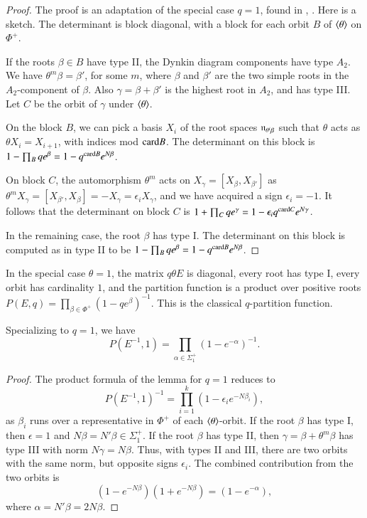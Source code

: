 \begin{proof} The proof is an adaptation  of the special case $q=1$, 
found in \cite{jantzen1977darstellungen}, \cite{wendt2001weyl}.  Here is a sketch.
The determinant is block diagonal, with a block for each orbit $B$ of $\langle{\theta}\rangle$ on $\Phi^+$.

If the roots $\beta\in B$ have type II, the Dynkin diagram components have type $A_2$.
We have $\theta^m \beta = \beta'$, for some $m$, where $\beta$ and $\beta'$ are the two simple roots in the $A_2$-component of $\beta$.
Also $\gamma = \beta + \beta'$ is the highest root in $A_2$, and has type III.  
Let $C$ be the orbit of $\gamma$ under $\langle{\theta}\rangle$.  

On the block $B$, we can pick a basis $X_i$ of the
root spaces ${\mathfrak n}_{\theta^i\beta}$ such that $\theta$ acts as $\theta X_i = X_{i+1}$, with indices mod ${\operatorname{card}}{B}$.
The determinant on this block is $1- \prod_B {q e^{\beta}} = 1- q^{{\operatorname{card}} B} e^{N \beta}$.

On block $C$, the automorphism $\theta^m$ acts on $X_\gamma = [X_\beta,X_{\beta'}]$ 
as $\theta^m X_\gamma = [X_{\beta'},X_\beta] = -X_\gamma =\epsilon_i X_\gamma$, 
and we have acquired a sign $\epsilon_i=-1$.  
It follows that the determinant on block $C$
is $1+\prod_C {q e^\gamma} = 1-\epsilon_i q^{{\operatorname{card}} C} e^{N\gamma}$.

In the remaining case,  the root $\beta$ has type I.  
The determinant on this block is computed as in  type II to be $1- \prod_B q e^{\beta} = 1- q^{{\operatorname{card}}{B}} e^{N \beta}$.
\end{proof}


In the special case $\theta=1$, the matrix $q \theta E$ is diagonal, every root has type I, every orbit has cardinality $1$,
and the partition function
is a product over positive roots 
$P(E,q) = \prod_{\beta\in\Phi^+} (1- q e^\beta)^{-1}$.  This is the classical $q$-partition function.


\begin{corollary}\label{cor:prod1} Specializing to $q=1$, we have
\[
P(E^{-1},1) = \prod_{\alpha\in\Sigma^+_1} (1-e^{-\alpha})^{-1}.
\]
\end{corollary}

\begin{proof}  The product formula of the lemma for $q=1$ reduces to
\[
P(E^{-1},1)^{-1} = \prod_{i=1}^k (1- \epsilon_i e^{-N\beta_i}),
\]
as $\beta_i$ runs over a representative in $\Phi^+$ of each $\langle{\theta}\rangle$-orbit.
If the root $\beta$ has type I, then $\epsilon=1$ and $N\beta = N'\beta \in \Sigma^+_1$.
If the root $\beta$ has type II, then 
$\gamma = \beta+\theta^m\beta$ has type III with norm $N\gamma = N\beta$.
Thus, with types II and III, there are two orbits with the same norm, but opposite signs $\epsilon_i$.  
The combined contribution from the
two orbits is
\[
(1- e^{-N\beta})(1+e^{-N\beta}) = (1-e^{-\alpha}),
\]
where $\alpha = N'\beta = 2N\beta$.
\end{proof}

